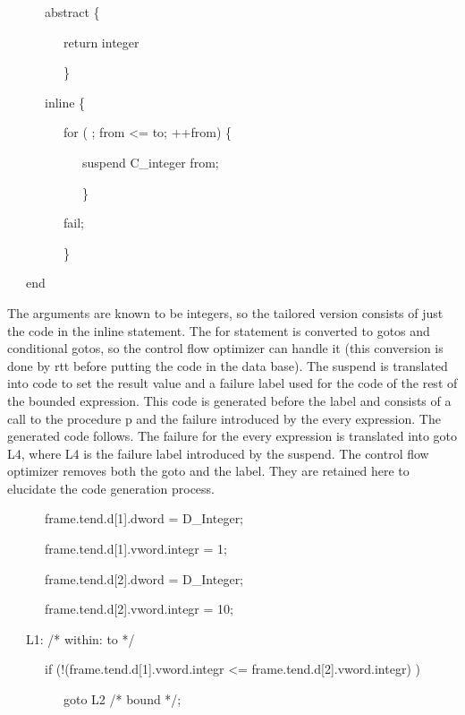 {\ttfamily\mdseries
\ \ \ \ \ \ abstract \{}

{\ttfamily\mdseries
\ \ \ \ \ \ \ \ \ return integer}

{\ttfamily\mdseries
\ \ \ \ \ \ \ \ \ \}}

{\ttfamily\mdseries
\ \ \ \ \ \ inline \{}

{\ttfamily\mdseries
\ \ \ \ \ \ \ \ \ for ( ; from {\textless}= to; ++from) \{}

{\ttfamily\mdseries
\ \ \ \ \ \ \ \ \ \ \ \ suspend C\_integer from;}

{\ttfamily\mdseries
\ \ \ \ \ \ \ \ \ \ \ \ \}}

{\ttfamily\mdseries
\ \ \ \ \ \ \ \ \ fail;}

{\ttfamily\mdseries
\ \ \ \ \ \ \ \ \ \}}

{\ttfamily\mdseries
\ \ \ end}


The arguments are known to be integers, so the tailored version
consists of just the code in the inline statement. The for statement
is converted to gotos and conditional gotos, so the control flow
optimizer can handle it (this conversion is done by rtt before putting
the code in the data base). The suspend is translated into code to set
the result value and a failure label used for the code of the rest of
the bounded expression. This code is generated before the label and
consists of a call to the procedure p and the failure introduced by
the every expression. The generated code follows. The failure for the
every expression is translated into goto L4, where L4 is the failure
label introduced by the suspend. The control flow optimizer removes
both the goto and the label. They are retained here to elucidate the
code generation process.

{\ttfamily\mdseries
\ \ \ \ \ \ frame.tend.d[1].dword = D\_Integer;}

{\ttfamily\mdseries
\ \ \ \ \ \ frame.tend.d[1].vword.integr = 1;}

{\ttfamily\mdseries
\ \ \ \ \ \ frame.tend.d[2].dword = D\_Integer;}

{\ttfamily\mdseries
\ \ \ \ \ \ frame.tend.d[2].vword.integr = 10;}


\bigskip

{\ttfamily\mdseries
\ \ \ L1: /* within: to */}

{\ttfamily\mdseries
\ \ \ \ \ \ if (!(frame.tend.d[1].vword.integr {\textless}= frame.tend.d[2].vword.integr) )}

{\ttfamily\mdseries
\ \ \ \ \ \ \ \ \ goto L2 /* bound */;}

